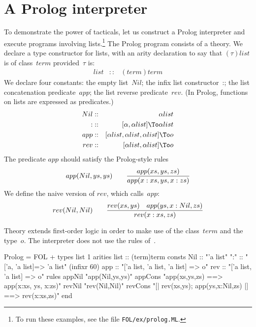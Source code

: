 \section{A {\sc Prolog} interpreter}
To demonstrate the power of tacticals, let us construct a {\sc Prolog}
interpreter and execute programs involving lists.\footnote{To run these
examples, see the file {\tt FOL/ex/prolog.ML}.} The {\sc Prolog} program
consists of a theory.  We declare a type constructor for lists, with an
arity declaration to say that $(\tau)list$ is of class~$term$
provided~$\tau$ is:
\begin{eqnarray*}
  list  & :: & (term)term
\end{eqnarray*}
We declare four constants: the empty list~$Nil$; the infix list
constructor~{:}; the list concatenation predicate~$app$; the list reverse
predicate~$rev$.  (In {\sc Prolog}, functions on lists are expressed as
predicates.)
\begin{eqnarray*}
    Nil         & :: & \alpha list \\
    {:}         & :: & [\alpha,\alpha list] \To \alpha list \\
    app & :: & [\alpha list,\alpha list,\alpha list] \To o \\
    rev & :: & [\alpha list,\alpha list] \To o 
\end{eqnarray*}
The predicate $app$ should satisfy the {\sc Prolog}-style rules
\[ {app(Nil,ys,ys)} \qquad
   {app(xs,ys,zs) \over app(x:xs, ys, x:zs)} \]
We define the naive version of $rev$, which calls~$app$:
\[ {rev(Nil,Nil)} \qquad
   {rev(xs,ys)\quad  app(ys, x:Nil, zs) \over
    rev(x:xs, zs)} 
\]

Theory  extends first-order logic in order to make use
of the class~$term$ and the type~$o$.  The interpreter does not use the
rules of~.
\begin{ttbox}
Prolog = FOL +
types   list 1
arities list    :: (term)term
consts  Nil     :: "'a list"
        ":"     :: "['a, 'a list]=> 'a list"            (infixr 60)
        app     :: "['a list, 'a list, 'a list] => o"
        rev     :: "['a list, 'a list] => o"
rules   appNil  "app(Nil,ys,ys)"
        appCons "app(xs,ys,zs) ==> app(x:xs, ys, x:zs)"
        revNil  "rev(Nil,Nil)"
        revCons "[| rev(xs,ys); app(ys,x:Nil,zs) |] ==> rev(x:xs,zs)"
end
\end{ttbox}
